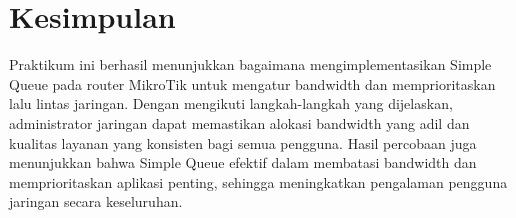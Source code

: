 \section*{Kesimpulan}

Praktikum ini berhasil menunjukkan bagaimana mengimplementasikan Simple Queue pada router MikroTik untuk mengatur bandwidth dan memprioritaskan lalu lintas jaringan. Dengan mengikuti langkah-langkah yang dijelaskan, administrator jaringan dapat memastikan alokasi bandwidth yang adil dan kualitas layanan yang konsisten bagi semua pengguna. Hasil percobaan juga menunjukkan bahwa Simple Queue efektif dalam membatasi bandwidth dan memprioritaskan aplikasi penting, sehingga meningkatkan pengalaman pengguna jaringan secara keseluruhan.